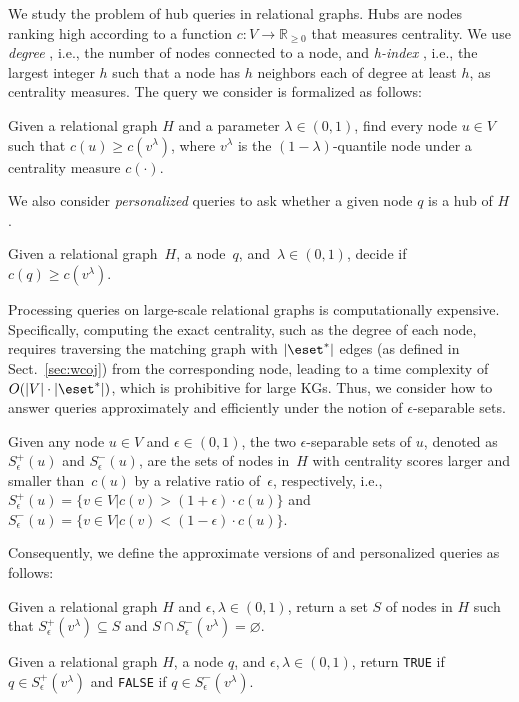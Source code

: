 We study the problem of hub queries in relational graphs.
Hubs are nodes ranking high according to a function $c: V \rightarrow \mathbb{R}_{\geq 0}$ that measures centrality.
We use \emph{degree} \cite{DasSP18}, i.e., the number of nodes connected to a node, and \emph{h-index} \cite{LuZZS16}, i.e., the largest integer $h$ such that a node has $h$ neighbors each of degree at least $h$, as centrality measures.
The \ced query we consider is formalized as follows:
\begin{problem}\label{def:hub}
  Given a relational graph $H$ and a parameter $\lambda\in(0,1)$, find every node $u \in V$ such that $c(u) \geq c(v^{\lambda})$, where $v^{\lambda}$ is the $(1-\lambda)$-quantile node under a centrality measure $c(\cdot)$.
\end{problem}
We also consider \emph{personalized} \ced queries to ask whether a given node $q$ is a hub of $H$.
\begin{problem}\label{problem:exactPer}
  Given a relational graph~$H$, a node~$q$, and~$\lambda \in (0,1)$, decide if~$c(q) \geq c(v^\lambda)$.
\end{problem}

Processing \ced queries on large-scale relational graphs is computationally expensive. Specifically, computing the exact centrality, such as the degree of each node, requires traversing the matching graph with $|\eset^*|$ edges (as defined in Sect.~\ref{sec:wcoj}) from the corresponding node, leading to a time complexity of $O(|V|\cdot|\eset^*|)$, which is prohibitive for large KGs. Thus, we consider how to answer \ced queries approximately and efficiently under the notion of $\epsilon$-separable sets.
\begin{definition}
  Given any node $u\in V$ and $\epsilon\in(0,1)$, the two $\epsilon$-separable sets of $u$, denoted as $S^+_\epsilon(u)$ and $S^-_\epsilon(u)$, are the sets of nodes in~$H$ with centrality scores larger and smaller than~$c(u)$ by a relative ratio of~$\epsilon$, respectively, i.e., $S^+_\epsilon(u) = \{v \in V | c(v) > (1+\epsilon) \cdot c(u)\}$ and $S^-_\epsilon(u)=\{v \in V | c(v) < (1-\epsilon) \cdot c(u)\}$.
\end{definition}
Consequently, we define the approximate versions of \ced and personalized \ced queries as follows:
\begin{problem}\label{problem:approxHUB}
  Given a relational graph $H$ and $\epsilon, \lambda \in (0, 1)$, return a set $S$ of nodes in $H$ such that $S^+_\epsilon(v^\lambda) \subseteq S$ and $S \cap S^-_\epsilon(v^\lambda) = \varnothing$.
\end{problem}
\begin{problem}\label{problem:approxPer}
  Given a relational graph $H$, a node $q$, and $\epsilon, \lambda \in (0, 1)$, return \texttt{TRUE} if $q\in S^+_\epsilon(v^\lambda)$ and \texttt{FALSE} if $q\in S^-_\epsilon(v^\lambda)$.
\end{problem}

